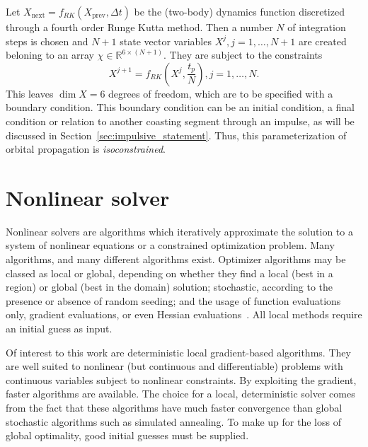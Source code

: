 Let \(X_{\text{next}} = f_{RK}(X_{\text{prev}}, \Delta t)\) be the (two-body) dynamics function discretized through a fourth order Runge Kutta method. Then a number \(N\) of integration steps is chosen and \(N+1\) state vector variables \(X^j, j=1,\dots,N+1\) are created beloning to an array \(\chi \in \mathbb{R}^{6 \times (N+1)}\). They are subject to the constraints
\begin{equation}
    X^{j+1} = f_{RK}(X^j, \frac{t_p}{N}), j = 1, \dots, N.
\end{equation}
This leaves \(\dim X = 6\) degrees of freedom, which are to be specified with a boundary condition. This boundary condition can be an initial condition, a final condition or relation to another coasting segment through an impulse, as will be discussed in Section~\ref{sec:impulsive_statement}. Thus, this parameterization of orbital propagation is \textit{isoconstrained}.

\section{Nonlinear solver}

Nonlinear solvers are algorithms which iteratively approximate the solution to a system of nonlinear equations or a constrained optimization problem. Many algorithms, and many different algorithms exist. Optimizer algorithms may be classed as local or global, depending on whether they find a local (best in a region) or global (best in the domain) solution; stochastic, according to the presence or absence of random seeding; and the usage of function evaluations only, gradient evaluations, or even Hessian evaluations~\cite{numerical_recipes}. All local methods require an initial guess as input.

Of interest to this work are deterministic local gradient-based algorithms. They are well suited to nonlinear (but continuous and differentiable) problems with continuous variables subject to nonlinear constraints. By exploiting the gradient, faster algorithms are available. The choice for a local, deterministic solver comes from the fact that these algorithms have much faster convergence than global stochastic algorithms such as simulated annealing. To make up for the loss of global optimality, good initial guesses must be supplied.

